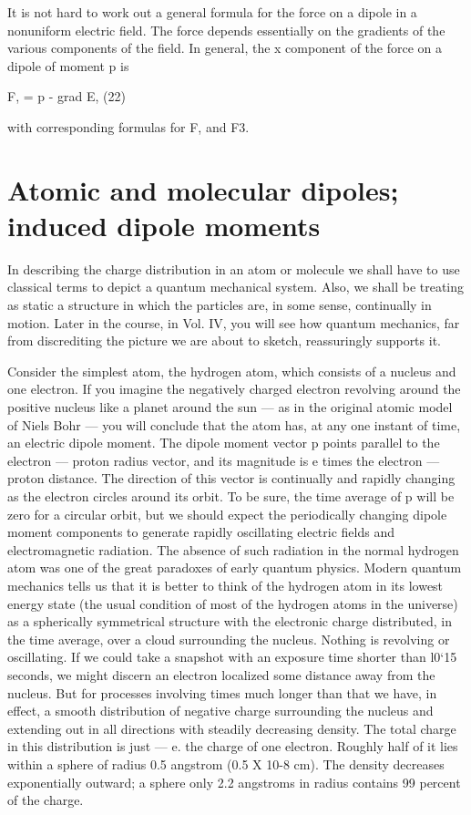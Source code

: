 {It is not hard to work out a general formula for the force on a dipole
in a nonuniform electric field. The force depends essentially on the
gradients of the various components of the field. In general, the
x component of the force on a dipole of moment p is

\begin{equation}
\end{equation}
F, = p - grad E, (22)

with corresponding formulas for F, and F3.

\section{Atomic and molecular dipoles; induced dipole moments}

In describing the charge distribution in an atom or molecule we
shall have to use classical terms to depict a quantum mechanical
system. Also, we shall be treating as static a structure in which the
particles are, in some sense, continually in motion. Later in the
course, in Vol. IV, you will see how quantum mechanics, far from discrediting
the picture we are about to sketch, reassuringly supports it.

Consider the simplest atom, the hydrogen atom, which consists of
a nucleus and one electron. If you imagine the negatively charged
electron revolving around the positive nucleus like a planet around
the sun --- as in the original atomic model of Niels Bohr --- you will
conclude that the atom has, at any one instant of time, an electric
dipole moment. The dipole moment vector p points parallel to the
electron --- proton radius vector, and its magnitude is e times the
electron --- proton distance. The direction of this vector is continually
and rapidly changing as the electron circles around its orbit. To be
sure, the time average of p will be zero for a circular orbit, but we
should expect the periodically changing dipole moment components
to generate rapidly oscillating electric fields and electromagnetic
radiation. The absence of such radiation in the normal hydrogen
atom was one of the great paradoxes of early quantum physics.
Modern quantum mechanics tells us that it is better to think of the
hydrogen atom in its lowest energy state (the usual condition of most
of the hydrogen atoms in the universe) as a spherically symmetrical
structure with the electronic charge distributed, in the time average,
over a cloud surrounding the nucleus. Nothing is revolving or
oscillating. If we could take a snapshot with an exposure time
shorter than l0‘15 seconds, we might discern an electron localized
some distance away from the nucleus. But for processes involving
times much longer than that we have, in effect, a smooth distribution
of negative charge surrounding the nucleus and extending out in all
directions with steadily decreasing density. The total charge in this
distribution is just  --- e. the charge of one electron. Roughly half of
it lies within a sphere of radius 0.5 angstrom (0.5 X 10-8 cm). The
density decreases exponentially outward; a sphere only 2.2 angstroms
in radius contains 99 percent of the charge.

}
